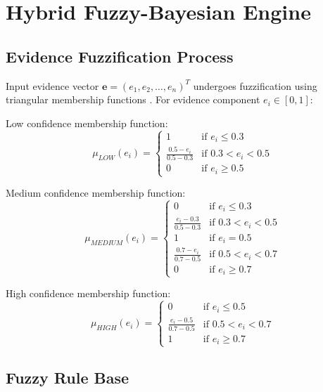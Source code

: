 
\section{Hybrid Fuzzy-Bayesian Engine}

\subsection{Evidence Fuzzification Process}

Input evidence vector $\mathbf{e} = (e_1, e_2, \ldots, e_n)^T$ undergoes fuzzification using triangular membership functions \cite{dubois1980fuzzy}. For evidence component $e_i \in [0, 1]$:

Low confidence membership function:
\begin{equation}
\mu_{LOW}(e_i) = \begin{cases}
1 & \text{if } e_i \leq 0.3 \\
\frac{0.5 - e_i}{0.5 - 0.3} & \text{if } 0.3 < e_i < 0.5 \\
0 & \text{if } e_i \geq 0.5
\end{cases}
\end{equation}

Medium confidence membership function:
\begin{equation}
\mu_{MEDIUM}(e_i) = \begin{cases}
0 & \text{if } e_i \leq 0.3 \\
\frac{e_i - 0.3}{0.5 - 0.3} & \text{if } 0.3 < e_i < 0.5 \\
1 & \text{if } e_i = 0.5 \\
\frac{0.7 - e_i}{0.7 - 0.5} & \text{if } 0.5 < e_i < 0.7 \\
0 & \text{if } e_i \geq 0.7
\end{cases}
\end{equation}

High confidence membership function:
\begin{equation}
\mu_{HIGH}(e_i) = \begin{cases}
0 & \text{if } e_i \leq 0.5 \\
\frac{e_i - 0.5}{0.7 - 0.5} & \text{if } 0.5 < e_i < 0.7 \\
1 & \text{if } e_i \geq 0.7
\end{cases}
\end{equation}

\subsection{Fuzzy Rule Base}


